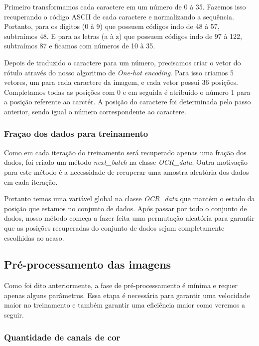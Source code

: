 Primeiro transformamos cada caractere em um número de 0 à 35. Fazemos
isso recuperando o código ASCII de cada caractere e normalizando a
sequência. Portanto, para os dígitos (0 à 9) que possuem códigos indo
de 48 à 57, subtraímos 48. E para as letras (a à z) que possuem
códigos indo de 97 à 122, subtraímos 87 e ficamos com números de 10 à
35. 

Depois de traduzido o caractere para um número, precisamos criar o
vetor do rótulo através do nosso algoritmo de \textit{One-hot
  encoding}. Para isso criamos 5 vetores, um para cada caractere da
imagem, e cada vetor possui 36 posições. Completamos todas as posições
com 0 e em seguida é atribuído o número 1 para a posição referente ao
carctér. A posição do caractere foi determinada pelo passo anterior,
sendo igual o número correspondente ao caractere.

\subsubsection{Fraçao dos dados para treinamento}

Como em cada iteração do treinamento será recuperado apenas uma fração
dos dados, foi criado um método \textit{next\_batch} na classe
\textit{OCR\_data}. Outra motivação para este método é a necessidade de
recuperar uma amostra aleatória dos dados em cada iteração. 

Portanto temos uma variável global na classe \textit{OCR\_data} que
mantém o estado da posição que estamos no conjunto de dados. Após
passar por todo o conjunto de dados, nosso método começa a fazer feita
uma permutação aleatória para garantir que as posições recuperadas do
conjunto de dados sejam completamente escolhidas ao acaso.

\subsection{Pré-processamento das imagens}

Como foi dito anteriormente, a fase de pré-processamento é mínima e
requer apenas alguns parâmetros. Essa etapa é necessária para garantir
uma velocidade maior no treinamento e também garantir uma eficiência
maior como veremos a seguir.

\subsubsection{Quantidade de canais de cor}

